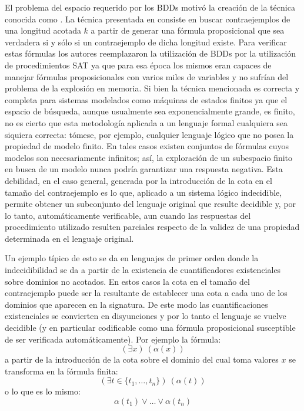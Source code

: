 El problema del espacio requerido por los BDDs motivó la creación de la
técnica conocida como \bmc\cite{Biere:1999:SMC:646483.691738}. La técnica
presentada en \cite{Biere:1999:SMC:646483.691738} consiste en buscar
contraejemplos de una longitud acotada $k$ a partir de generar una fórmula
proposicional que sea verdadera si y sólo si un contraejemplo de dicha
longitud existe. Para verificar estas fórmulas los autores reemplazaron la
utilización de BDDs por la utilización de procedimientos SAT ya que para esa
época los mismos eran capaces de manejar fórmulas proposicionales con varios
miles de variables y no sufrían del problema de la explosión en memoria. Si
bien la técnica mencionada es correcta y completa para sistemas modelados como
máquinas de estados finitos ya que el espacio de búsqueda, aunque usualmente
sea exponencialmente grande, es finito, no es cierto que esta metodología
aplicada a un lenguaje formal cualquiera sea siquiera correcta: tómese, por
ejemplo, cualquier lenguaje lógico que no posea la propiedad de modelo finito.
En tales casos existen conjuntos de fórmulas cuyos modelos son necesariamente
infinitos; así, la exploración de un subespacio finito en busca de un modelo
nunca podría garantizar una respuesta negativa. Esta debilidad, en el caso general,
generada por la introducción de la cota en el tamaño del contraejemplo es lo
que, aplicado a un sistema lógico indecidible, permite obtener un subconjunto
del lenguaje original que resulte decidible y, por lo tanto, automáticamente
verificable, aun cuando las respuestas del procedimiento utilizado resulten
parciales respecto de la validez de una propiedad determinada en el lenguaje
original.

Un ejemplo típico de esto se da en lenguajes de primer orden donde la
indecidibilidad se da a partir de la existencia de cuantificadores
existenciales sobre dominios no acotados. En estos casos la cota en el tamaño
del contraejemplo puede ser la resultante de establecer una cota a cada uno de
los dominios que aparecen en la signatura. De este modo las cuantificaciones
existenciales se convierten en disyunciones y por lo tanto el lenguaje se
vuelve decidible (y en particular codificable como una fórmula proposicional
susceptible de ser verificada automáticamente). Por ejemplo la fórmula:
\begin{equation}(\exists x)\ (\alpha(x))\end{equation}  \noindent a partir de
la introducción de la cota sobre el dominio del cual toma valores $x$ se
transforma en la fórmula finita:  \begin{equation}\left(\exists t \in
\{t_1,\ldots,t_n\}\right)\ \left(\alpha(t)\right)\end{equation}  \noindent o
lo que es lo mismo:  \begin{equation} \alpha(t_1) \vee \ldots \vee
\alpha(t_n)\end{equation}

